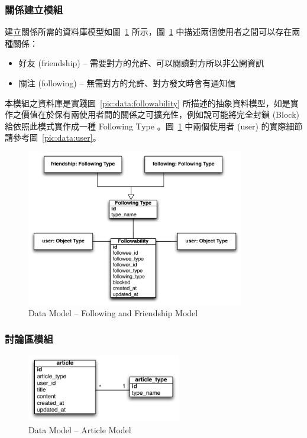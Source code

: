 \subsubsection{關係建立模組}
\label{sssec:following}
建立關係所需的資料庫模型如圖~\ref{pic:data:user2user} 所示，圖~\ref{pic:data:user2user} 中描述兩個使用者之間可以存在兩種關係：
\begin{itemize}
\item{好友 (friendship) -- 需要對方的允許、可以閱讀對方所以非公開資訊}
\item{關注 (following) -- 無需對方的允許、對方發文時會有通知信}
\end{itemize}
本模組之資料庫是實踐圖~\ref{pic:data:followability} 所描述的抽象資料模型，如是實作之價值在於保有兩使用者間的關係之可擴充性，例如說可能將完全封鎖 (Block) 給依照此模式實作成一種 Following Type 。圖~\ref{pic:data:user2user} 中兩個使用者 (user) 的實際細節請參考圖~\ref{pic:data:user}。

\begin{figure}[H]
\centering
\includegraphics[width=0.85\textwidth]{img/datamodel/user2user.pdf}
\caption{Data Model -- Following and Friendship Model}
\label{pic:data:user2user}
\end{figure}

\subsubsection{討論區模組}
\label{sssec:forum}

\begin{figure}[H]
\centering
\includegraphics[width=0.6\textwidth]{img/datamodel/article.pdf}
\caption{Data Model -- Article Model}
\label{pic:data:article}
\end{figure}


